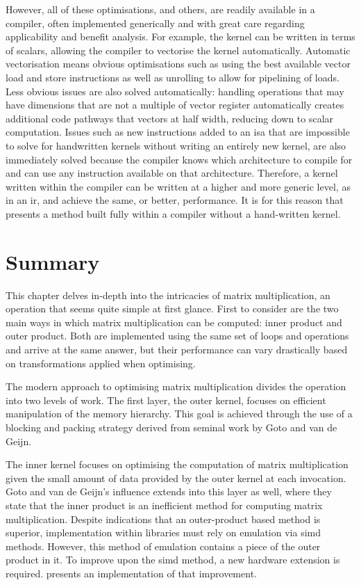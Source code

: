 \documentclass[\main/thesis.tex]{subfiles}
\begin{document}
However, all of these optimisations, and others, are readily available in a compiler, often implemented generically and with great care regarding applicability and benefit analysis.
For example, the kernel can be written in terms of scalars, allowing the compiler to vectorise the kernel automatically.
Automatic vectorisation means obvious optimisations such as using the best available vector load and store instructions as well as unrolling to allow for pipelining of loads.
Less obvious issues are also solved automatically: handling operations that may have dimensions that are not a multiple of vector register automatically creates additional code pathways that vectors at half width, reducing down to scalar computation.
Issues such as new instructions added to an \gls{isa} that are impossible to solve for handwritten kernels without writing an entirely new kernel, are also immediately solved because the compiler knows which architecture to compile for and can use any instruction available on that architecture.
Therefore, a kernel written within the compiler can be written at a higher and more generic level, as in an \gls{ir}, and achieve the same, or better, performance.
It is for this reason that  presents a method built fully within a compiler without a hand-written kernel.

\section{Summary}
This chapter delves in-depth into the intricacies of matrix multiplication, an operation that seems quite simple at first glance.
First to consider are the two main ways in which matrix multiplication can be computed: inner product and outer product.
Both are implemented using the same set of loops and operations and arrive at the same answer, but their performance can vary drastically based on transformations applied when optimising.

The modern approach to optimising matrix multiplication divides the operation into two levels of work.
The first layer, the outer kernel, focuses on efficient manipulation of the memory hierarchy.
This goal is achieved through the use of a blocking and packing strategy derived from seminal work by Goto and van de Geijn.

The inner kernel focuses on optimising the computation of matrix multiplication given the small amount of data provided by the outer kernel at each invocation.
Goto and van de Geijn's influence extends into this layer as well, where they state that the inner product is an inefficient method for computing matrix multiplication.
Despite indications that an outer-product based method is superior, implementation within libraries must rely on emulation via \gls{simd} methods.
However, this method of emulation contains a piece of the outer product in it.
To improve upon the \gls{simd} method, a new hardware extension is required.
 presents an implementation of that improvement.
\end{document}

